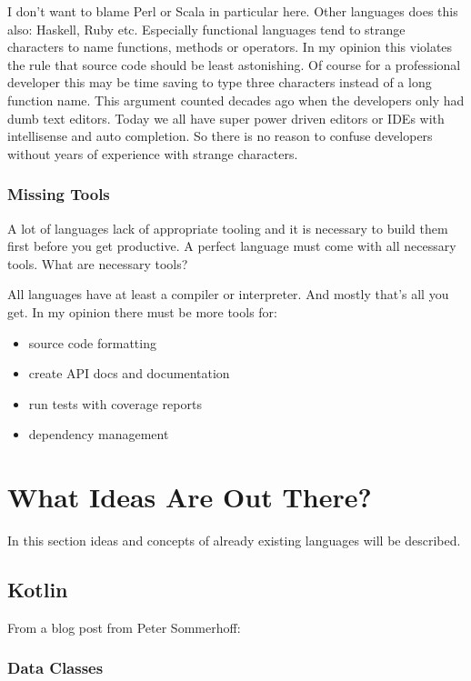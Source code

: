 \documentclass[a4paper,12pt]{report}
\begin{document}
I don't want to blame Perl or Scala in particular here. Other languages does this also: Haskell, Ruby etc. Especially functional languages tend to strange characters to name functions, methods or operators. In my opinion this violates the rule that source code should be least astonishing. Of course for a professional developer this may be time saving to type three characters instead of a long function name. This argument counted decades ago when the developers only had dumb text editors. Today we all have super power driven editors or IDEs with intellisense and auto completion. So there is no reason to confuse developers without years of experience with strange characters.

\subsection{Missing Tools}

A lot of languages lack of appropriate tooling and it is necessary to build them first before you get productive. A perfect language must come with all necessary tools. What are necessary tools?

All languages have at least a compiler or interpreter. And mostly that's all you get. In my opinion there must be more tools for:

\begin{itemize}
    \item source code formatting
    \item create API docs and documentation
    \item run tests with coverage reports
    \item dependency management
\end{itemize}

\chapter{What Ideas Are Out There?}

In this section ideas and concepts of already existing languages will be described.

\section{Kotlin}

From a blog post from Peter Sommerhoff\cite{kotlin-sommerhoff}:

\subsection{Data Classes}
\end{document}
